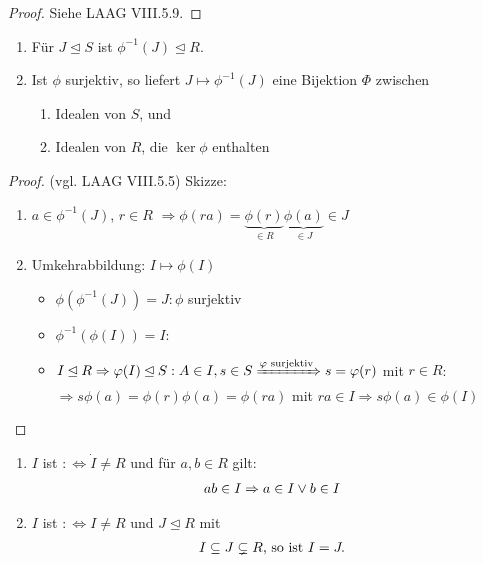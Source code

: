\begin{proof}
	Siehe LAAG VIII.5.9.
\end{proof}

\begin{lemma}
	\begin{enumerate}
		\item Für $J \unlhd S$ ist $\phi^{-1}(J) \unlhd R$.
		\item Ist $\phi$ surjektiv, so liefert $J \mapsto \phi^{-1}(J)$ eine Bijektion $\Phi$ zwischen
		\begin{enumerate}
			\item Idealen von $S$, und
			\item Idealen von $R$, die $\ker \phi$ enthalten
		\end{enumerate}
	\end{enumerate}
\end{lemma}

\begin{proof}
	(vgl. LAAG VIII.5.5)
	Skizze:
	\begin{enumerate}
		\item $a \in \phi^{-1}(J)$, $r \in R$ $\Rightarrow \phi(ra) = \underbrace{\phi(r)}_{\in R}\underbrace{\phi(a)}_{\in J}\in J$
		\item Umkehrabbildung: $I \mapsto \phi(I)$
		\begin{itemize}
			\item $\phi(\phi^{-1}(J))=J\colon \phi$ surjektiv
			\item $\phi^{-1}(\phi(I)) = I\colon$ 
			\item $I \unlhd R \Rightarrow \phi(I) \unlhd S: A \in I, s \in S \xRightarrow{\phi \text{ surjektiv}} s = \phi(r)$ mit $r \in R$:\\
			$\Rightarrow s \phi(a) = \phi(r)\phi(a) = \phi(ra)$ mit $ra \in I \Rightarrow s\phi(a) \in \phi(I)$
		\end{itemize}
	\end{enumerate}
\end{proof}

\begin{definition}
	\begin{enumerate}
		\item $I$ ist  $:\Leftrightarrow \dot{I} \neq R$ und für $a,b \in R$ gilt:
		\begin{align}
			ab \in I \Rightarrow a \in I \vee b \in I\notag
		\end{align}
		\item $I$ ist  $:\Leftrightarrow I \neq R$ und $J \unlhd R$ mit
		\begin{align}
			I \subseteq J \subsetneq R\text{, so ist } I = J. \notag
		\end{align}
	\end{enumerate}
\end{definition}

